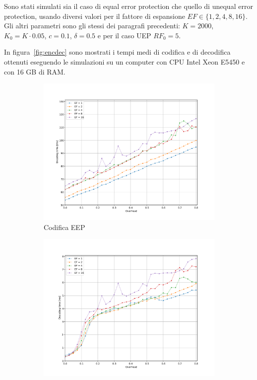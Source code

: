 \documentclass[italian, a4paper, 12pt]{article}
\begin{document}
Sono stati simulati sia il caso di equal error protection che quello
di unequal error protection, usando diversi valori per il fattore di
espansione $EF \in \{ 1,2,4,8,16 \}$.
%
Gli altri parametri sono gli stessi dei paragrafi precedenti: $K =
2000$, $K_0 = K \cdot 0.05$, $c=0.1$, $\delta=0.5$ e per il caso UEP
$RF_0 = 5$.

In figura~\ref{fig:encdec} sono mostrati i tempi medi di codifica e di
decodifica ottenuti eseguendo le simulazioni su un computer con CPU
Intel Xeon E5450 e con 16 GB di RAM.
%
\begin{figure}[htb]
  \centering
  \begin{subfigure}{0.5\textwidth}
    \centering
    \includegraphics[width=\textwidth]{plot_enc_time_eep}
    \caption{Codifica EEP}
    \label{fig:enctime_eep}
  \end{subfigure}%
  \begin{subfigure}{0.5\textwidth}
    \centering
    \includegraphics[width=\textwidth]{plot_dec_time_eep}

\end{subfigure}
\end{figure}
\end{document}
